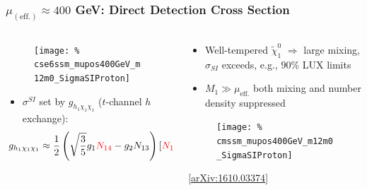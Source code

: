 \documentclass[10pt,aspectratio=169]{beamer}
\begin{document}
\begin{frame}
  \frametitle{$\mu_{(\text{eff.})} \approx 400$ GeV: Direct Detection
    Cross Section}
  \begin{columns}[t]
    \begin{column}{0.6\textwidth}
      \vspace{-25pt}
      \begin{figure}
        \texttt{[image: \%
          cse6ssm\_mupos400GeV\_m12m0\_SigmaSIProton]}
      \end{figure}
      \vspace*{-12pt}
      \begin{itemize}
      \item $\sigma^{SI}$ set by $g_{h_1 \chi_1 \chi_1}$ ($t$-channel $h$
        exchange):
        {
          \begin{equation*}\hspace*{-15pt}
            g_{h_1 \chi_1 \chi_1} \approx \frac{1}{2} \left (
            \sqrt{\frac{3}{5}} g_1
                 {\color{red} N_{14}}
                 - g_2 N_{13} \right ) \left [ {\color{red}N_{11}}
                   (U_h)_{11} - {\color{red}N_{12}} (U_h)_{12}
                   \right ]
        \end{equation*}}
      \end{itemize}
    \end{column}
    \begin{column}{0.4\textwidth}
      \vspace{-10pt}
      \begin{itemize}
        \item Well-tempered $\tilde{\chi}^0_1$ $\Rightarrow$ large
          mixing, {\color{red}$\sigma_{SI}$ exceeds, e.g., $90$\% LUX
            limits}
        \item $M_1 \gg \mu_{\text{eff.}}$ both mixing and number density
          suppressed
      \end{itemize}
      \vspace{-8pt}
      \begin{figure}
        \texttt{[image: \%
          cmssm\_mupos400GeV\_m12m0\_SigmaSIProton]}
      \end{figure}
      \vspace{-20pt}
      \begin{center}
        \tiny [\href{https://arxiv.org/abs/1610.03374}{arXiv:1610.03374}]
      \end{center}
    \end{column}
  \end{columns}
\end{frame}
\end{document}
